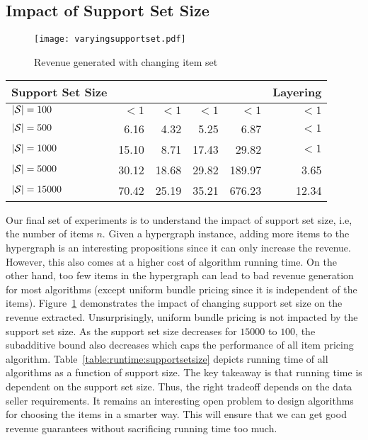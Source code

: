 \subsection{Impact of Support Set Size}


\begin{figure}[!t]
	\centering
	\texttt{[image: varyingsupportset.pdf]}
	\caption{Revenue generated with changing item set} \label{fig:supportsetsize}
\end{figure}  

\begin{table*}
	\begin{small}
		\begin{tabular}{@{}lrrrrr@{}}\toprule
			\textbf{Support Set Size} & \textbf{\lpip} & \textbf{\ubp} & \textbf{\uip} & \textbf{\cip} & \textbf{Layering}  \\ \midrule
			
			$|\mathcal{S}| = 100$ &  $<1$ & $<1$ & $<1$ & $<1$ & $<1$ \\ \hdashline
			$|\mathcal{S}| = 500$ &  6.16 & 4.32 &  5.25 & 6.87 & $<1$ \\ \hdashline
			$|\mathcal{S}| = 1000$ &  15.10 & 8.71 &  17.43 & 29.82 & $<1$ \\ \hdashline
			$|\mathcal{S}| = 5000$ &  30.12 & 18.68 &  29.82 & 189.97 & 3.65 \\ \hdashline
			$|\mathcal{S}| = 15000$ &  70.42 & 25.19 &  35.21 & 676.23 & 12.34 \\
			\bottomrule
		\end{tabular}
	\end{small}
	\caption{Algorithm running times (in seconds) for skewed workload}
	\label{table:runtime:supportsetsize}
\end{table*}

Our final set of experiments is to understand the impact of support set size, i.e, the number of items $n$. Given a hypergraph instance, adding more items to the hypergraph is an interesting propositions since it can only increase the revenue. However, this also comes at a higher cost of algorithm running time. On the other hand, too few items in the hypergraph can lead to bad revenue generation for most algorithms (except uniform bundle pricing since it is independent of the items). Figure~\ref{fig:supportsetsize} demonstrates the impact of changing support set size on the revenue extracted. Unsurprisingly, uniform bundle pricing is not impacted by the support set size. As the support set size decreases for $15000$ to $100$, the subadditive bound also decreases which caps the performance of all item pricing algorithm. Table~\ref{table:runtime:supportsetsize} depicts running time of all algorithms as a function of support size. The key takeaway is that running time is dependent on the support set size. Thus, the right tradeoff depends on the data seller requirements. It remains an interesting open problem to design algorithms for choosing the items in a smarter way. This will ensure that we can get good revenue guarantees without sacrificing running time too much.

